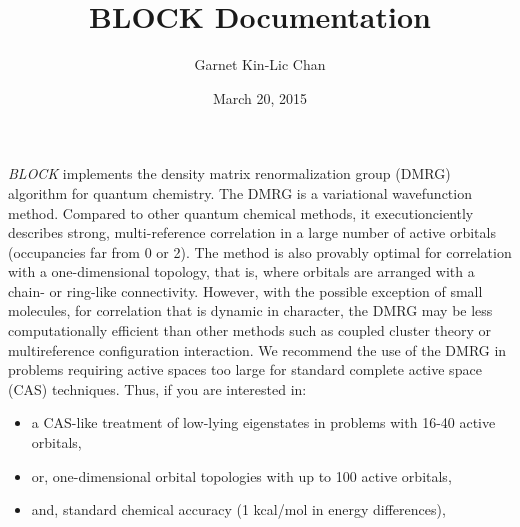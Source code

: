 \documentclass[letterpaper,10pt,english]{sphinxmanual}
\title{BLOCK Documentation}
\date{March 20, 2015}
\author{Garnet Kin-Lic Chan}
\begin{document}
\maketitle
\tableofcontents
{}\label{index::doc}

\begin{figure}[htbp]\begin{flushleft}

\end{flushleft}\end{figure}

\emph{BLOCK} implements the density matrix renormalization group (DMRG) algorithm for quantum chemistry.
The DMRG is a variational wavefunction method. Compared to other quantum chemical methods,
it executionciently describes strong, multi-reference correlation in a large number of active orbitals (occupancies far from 0 or 2).
The method is also provably optimal for correlation with a one-dimensional topology, that is,
where orbitals are arranged with a chain- or ring-like connectivity.
However, with the possible exception of small molecules, for correlation that is dynamic in character,
the DMRG may be less computationally efficient than other methods
such as coupled cluster theory or multireference configuration interaction.
We recommend the use of the DMRG in problems requiring active spaces too large for
standard complete active space (CAS) techniques. Thus, if you are interested in:
\begin{itemize}
\item {} 
a CAS-like treatment of low-lying eigenstates in problems with 16-40 active orbitals,

\item {} 
or, one-dimensional orbital topologies with up to 100 active orbitals,

\item {} 
and, standard chemical accuracy (1 kcal/mol in energy differences),

\end{itemize}
\end{document}
